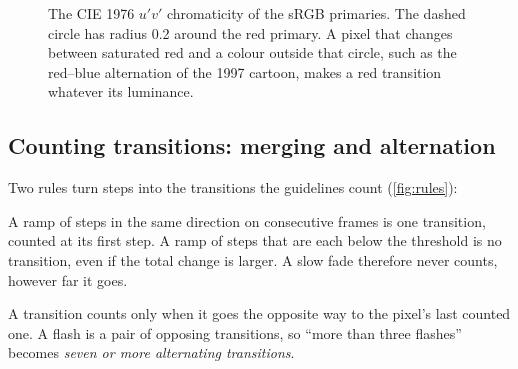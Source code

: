 \documentclass[11pt,a4paper]{article}
\begin{document}
\begin{figure}[ht]
  \centering
  \caption{The CIE 1976 $u'v'$ chromaticity of the sRGB primaries. The dashed circle has radius 0.2 around the red primary. A pixel that changes between saturated red and a colour outside that circle, such as the red--blue alternation of the 1997 cartoon, makes a red transition whatever its luminance.}
  \label{fig:uv}
\end{figure}

\subsection{Counting transitions: merging and alternation}

Two rules turn steps into the transitions the guidelines count (\cref{fig:rules}):

\begin{description}[font=\bfseries\color{ink}]
  \item[Steps merge.] A ramp of steps in the same direction on consecutive frames is one transition, counted at its first step. A ramp of steps that are each below the threshold is no transition, even if the total change is larger. A slow fade therefore never counts, however far it goes.
  \item[Transitions alternate.] A transition counts only when it goes the opposite way to the pixel's last counted one. A flash is a pair of opposing transitions, so ``more than three flashes'' becomes \emph{seven or more alternating transitions}.
\end{description}
\end{document}

